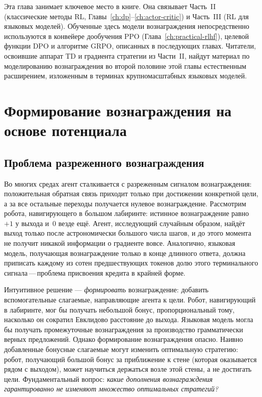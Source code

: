 Эта глава занимает ключевое место в книге. Она связывает Часть~II (классические методы RL, Главы~\ref{ch:dp}--\ref{ch:actor-critic}) и Часть~III (RL для языковых моделей). Обученные здесь модели вознаграждения непосредственно используются в конвейере дообучения PPO (Глава~\ref{ch:practical-rlhf}), целевой функции DPO и алгоритме GRPO, описанных в последующих главах. Читатели, освоившие аппарат TD и градиента стратегии из Части~II, найдут материал по моделированию вознаграждения во второй половине этой главы естественным расширением, изложенным в терминах крупномасштабных языковых моделей.

\section{Формирование вознаграждения на основе потенциала}
\label{sec:reward-shaping}

\subsection{Проблема разреженного вознаграждения}

Во многих средах агент сталкивается с разреженным сигналом вознаграждения: положительная обратная связь приходит только при достижении конкретной цели, а за все остальные переходы получается нулевое вознаграждение. Рассмотрим робота, навигирующего в большом лабиринте: истинное вознаграждение равно~$+1$ у выхода и~$0$ везде ещё. Агент, исследующий случайным образом, найдёт выход только после астрономически большого числа шагов, и до этого момента не получит никакой информации о градиенте вовсе. Аналогично, языковая модель, получающая вознаграждение только в конце длинного ответа, должна приписать каждому из сотен предшествующих токенов долю этого терминального сигнала\,---\,проблема присвоения кредита в крайней форме.

Интуитивное решение --- \emph{формировать} вознаграждение: добавить вспомогательные слагаемые, направляющие агента к цели. Робот, навигирующий в лабиринте, мог бы получать небольшой бонус, пропорциональный тому, насколько он сократил Евклидово расстояние до выхода. Языковая модель могла бы получать промежуточные вознаграждения за производство грамматически верных предложений. Однако формирование вознаграждения опасно. Наивно добавленные бонусные слагаемые могут изменить оптимальную стратегию: робот, получающий большой бонус за приближение к стене (которая оказывается рядом с выходом), может научиться держаться возле этой стены, а не достигать цели. Фундаментальный вопрос: \emph{какие дополнения вознаграждения гарантированно не изменяют множество оптимальных стратегий?}

